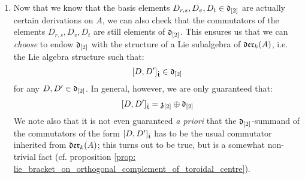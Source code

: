 \begin{remark}
\begin{enumerate}
                \item Now that we know that the basis elements $D_{r, s}, D_v, D_t \in \mathfrak{d}_{[2]}$ are actually certain derivations on $A$, we can also check that the commutators of the elements $D_{r, s}, D_v, D_t$ are still elements of $\mathfrak{d}_{[2]}$. This ensures us that we can \textit{choose} to endow $\mathfrak{d}_{[2]}$ with the structure of a Lie subalgebra of $\mathfrak{der}_{k}(A)$, i.e. the Lie algebra structure such that:
                    $$[D, D']_{\hat{\mathfrak{t}}} \in \mathfrak{d}_{[2]}$$
                for any $D, D' \in \mathfrak{d}_{[2]}$. In general, however, we are only guaranteed that:
                    $$[D, D']_{\hat{\mathfrak{t}}} = \mathfrak{z}_{[2]} \oplus \mathfrak{d}_{[2]}$$
                We note also that it is not even guaranteed \textit{a priori} that the $\mathfrak{d}_{[2]}$-summand of the commutators of the form $[D, D']_{\hat{\mathfrak{t}}}$ has to be the usual commutator inherited from $\mathfrak{der}_{k}(A)$; this turns out to be true, but is a somewhat non-trivial fact (cf. proposition \ref{prop: lie_bracket_on_orthogonal_complement_of_toroidal_centre}). 
            \end{enumerate}
        \end{remark}
        
